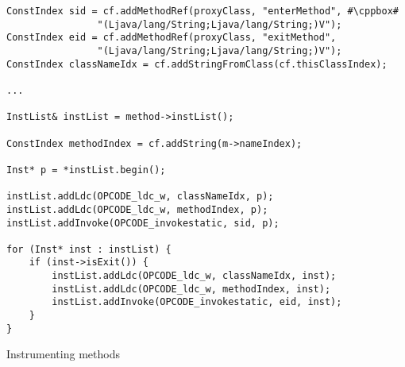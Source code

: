 \begin{listing}
\begin{verbatim}
ConstIndex sid = cf.addMethodRef(proxyClass, "enterMethod", #\cppbox#
				"(Ljava/lang/String;Ljava/lang/String;)V");
ConstIndex eid = cf.addMethodRef(proxyClass, "exitMethod",
				"(Ljava/lang/String;Ljava/lang/String;)V");
ConstIndex classNameIdx = cf.addStringFromClass(cf.thisClassIndex);

...

InstList& instList = method->instList();

ConstIndex methodIndex = cf.addString(m->nameIndex);

Inst* p = *instList.begin();

instList.addLdc(OPCODE_ldc_w, classNameIdx, p);
instList.addLdc(OPCODE_ldc_w, methodIndex, p);
instList.addInvoke(OPCODE_invokestatic, sid, p);

for (Inst* inst : instList) {
	if (inst->isExit()) {
		instList.addLdc(OPCODE_ldc_w, classNameIdx, inst);
		instList.addLdc(OPCODE_ldc_w, methodIndex, inst);
		instList.addInvoke(OPCODE_invokestatic, eid, inst);
	}
}
\end{verbatim}
\caption{Instrumenting  methods}
\label{usage-methodentryexit}
\end{listing}
